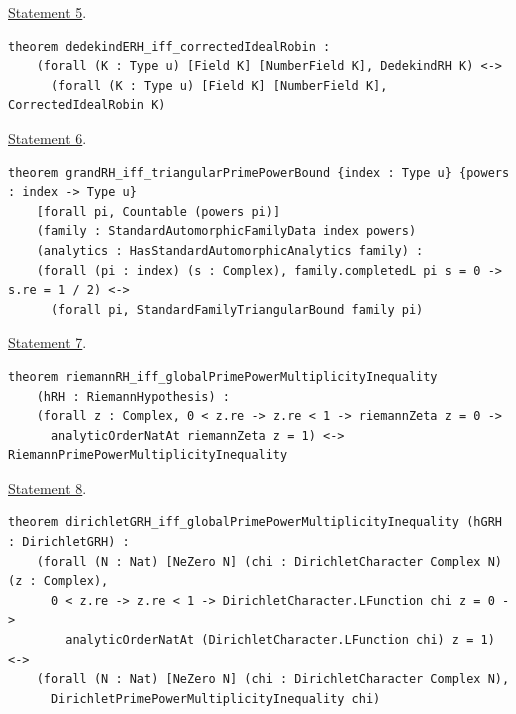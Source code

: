 \documentclass[11pt]{amsart}
\theoremstyle{definition}
\theoremstyle{remark}
\numberwithin{equation}{section}
\newcommand{\repositoryurl}{https://github.com/kimihiro64/Robin1984}
\newcommand{\proofrevision}{b359826e62c50b6cef55db4b2fcab793232498cc}
\begin{document}
{\noindent\begin{minipage}{\linewidth}
\noindent\href{\repositoryurl/blob/\proofrevision/Challenge.lean\#L246-L248}{Statement 5}.
\begin{verbatim}
theorem dedekindERH_iff_correctedIdealRobin :
    (forall (K : Type u) [Field K] [NumberField K], DedekindRH K) <->
      (forall (K : Type u) [Field K] [NumberField K], CorrectedIdealRobin K)
\end{verbatim}
\end{minipage}\par\smallskip

\noindent\begin{minipage}{\linewidth}
\noindent\href{\repositoryurl/blob/\proofrevision/Challenge.lean\#L259-L264}{Statement 6}.
\begin{verbatim}
theorem grandRH_iff_triangularPrimePowerBound {index : Type u} {powers : index -> Type u}
    [forall pi, Countable (powers pi)]
    (family : StandardAutomorphicFamilyData index powers)
    (analytics : HasStandardAutomorphicAnalytics family) :
    (forall (pi : index) (s : Complex), family.completedL pi s = 0 -> s.re = 1 / 2) <->
      (forall pi, StandardFamilyTriangularBound family pi)
\end{verbatim}
\end{minipage}\par\smallskip

\noindent\begin{minipage}{\linewidth}
\noindent\href{\repositoryurl/blob/\proofrevision/Challenge.lean\#L304-L307}{Statement 7}.
\begin{verbatim}
theorem riemannRH_iff_globalPrimePowerMultiplicityInequality
    (hRH : RiemannHypothesis) :
    (forall z : Complex, 0 < z.re -> z.re < 1 -> riemannZeta z = 0 ->
      analyticOrderNatAt riemannZeta z = 1) <-> RiemannPrimePowerMultiplicityInequality
\end{verbatim}
\end{minipage}\par\smallskip

\noindent\begin{minipage}{\linewidth}
\noindent\href{\repositoryurl/blob/\proofrevision/Challenge.lean\#L359-L364}{Statement 8}.
\begin{verbatim}
theorem dirichletGRH_iff_globalPrimePowerMultiplicityInequality (hGRH : DirichletGRH) :
    (forall (N : Nat) [NeZero N] (chi : DirichletCharacter Complex N) (z : Complex),
      0 < z.re -> z.re < 1 -> DirichletCharacter.LFunction chi z = 0 ->
        analyticOrderNatAt (DirichletCharacter.LFunction chi) z = 1) <->
    (forall (N : Nat) [NeZero N] (chi : DirichletCharacter Complex N),
      DirichletPrimePowerMultiplicityInequality chi)
\end{verbatim}
\end{minipage}\par\smallskip

}
\end{document}
